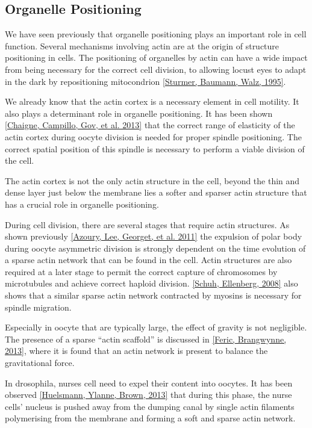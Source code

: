 \documentclass[A4paperpaper,11pt,english]{sphinxmanual}
\begin{document}
\subsection{Organelle Positioning}
\label{index-latex:organelle-positioning}\label{index-latex:id42}
We have seen previously that organelle positioning plays an important role in
cell function.  Several mechanisms involving actin are at the origin of
structure positioning in cells. The positioning of organelles by actin can have
a wide impact from being necessary for the correct cell division, to
allowing locust eyes to adapt in the dark by repositioning mitocondrion
{\hyperref[index-latex:sturmer1995]{{[}Sturmer, Baumann, Walz,  1995{]}}}.

We already know that the actin cortex is a necessary element in cell
motility. It also plays a determinant  role in organelle
positioning. It has been shown  {\hyperref[index-latex:chaigne2013a]{{[}Chaigne, Campillo, Gov,  et al.  2013{]}}} that the correct range
of elasticity of the actin cortex during oocyte division is needed for proper spindle
positioning. The correct spatial position of this spindle is necessary to
perform a viable division of the cell.

The actin cortex is not the only actin structure in the cell, beyond the thin and
dense layer just below the membrane lies a softer and sparser actin structure that has a
crucial role in organelle positioning.

During cell division, there are several stages that require actin structures.
As shown previously {\hyperref[index-latex:azoury2011]{{[}Azoury, Lee, Georget,  et al.  2011{]}}} the expulsion of polar body during
oocyte asymmetric division is  strongly dependent on the time evolution of a
sparse actin network that can be found in the cell. Actin structures are  also
required at a later stage to permit the correct capture of chromosomes by
microtubules and achieve correct haploid division.  {\hyperref[index-latex:schuh2008]{{[}Schuh, Ellenberg,  2008{]}}} also shows
that a similar sparse actin network contracted by myosins is necessary for
spindle migration.

Especially in oocyte that are typically large, the effect of gravity is not
negligible. The presence of a sparse ``actin scaffold'' is discussed in
{\hyperref[index-latex:feric2013]{{[}Feric, Brangwynne,  2013{]}}}, where it is found that an actin network is present to
balance the gravitational force.

In drosophila, nurses cell need to expel their content into oocytes. It has been
observed {\hyperref[index-latex:huelsmann2013]{{[}Huelsmann, Ylanne, Brown,  2013{]}}} that during this phase, the nurse cells' nucleus
is pushed away from the dumping canal by single actin filaments polymerising
from the membrane and forming a soft and sparse actin network.
\end{document}
